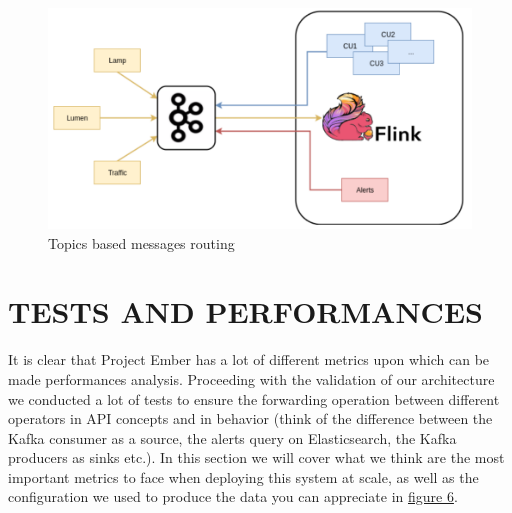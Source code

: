 \begin{figure}[!b]
\begin{center}
	\includegraphics[scale=0.50]{img/ember_kafkatopology}
	\caption{Topics based messages routing}
	\label{fig:ember_kafkatopology}
\end{center}
\end{figure}

\section{TESTS AND PERFORMANCES}
It is clear that Project Ember has a lot of different metrics upon which can be made performances analysis. Proceeding with the validation of our architecture we conducted a lot of tests to ensure the forwarding operation between different operators in API concepts and in behavior (think of the difference between the Kafka consumer as a source, the alerts query on Elasticsearch, the Kafka producers as sinks etc.). In this section we will cover what we think are the most important metrics to face when deploying this system at scale, as well as the configuration we used to produce the data you can appreciate in \hyperref[fig:ember_metrics]{figure 6}.

